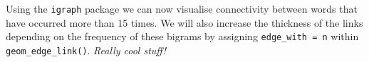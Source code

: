 \documentclass[
]{article}
\newenvironment{Shaded}{\begin{snugshade}}{\end{snugshade}}
\newcommand{\AttributeTok}[1]{\textcolor[rgb]{0.77,0.63,0.00}{#1}}
\newcommand{\FunctionTok}[1]{\textcolor[rgb]{0.00,0.00,0.00}{#1}}
\newcommand{\NormalTok}[1]{#1}
\newcommand{\OtherTok}[1]{\textcolor[rgb]{0.56,0.35,0.01}{#1}}
\newcommand{\SpecialCharTok}[1]{\textcolor[rgb]{0.00,0.00,0.00}{#1}}
\newcommand{\StringTok}[1]{\textcolor[rgb]{0.31,0.60,0.02}{#1}}
\begin{document}
\begin{Shaded}
\end{Shaded}

Using the \texttt{igraph} package we can now visualise connectivity
between words that have occurred more than 15 times. We will also
increase the thickness of the links depending on the frequency of these
bigrams by assigning \texttt{edge\_with\ =\ n} within
\texttt{geom\_edge\_link()}. \emph{Really cool stuff!}
\end{document}
